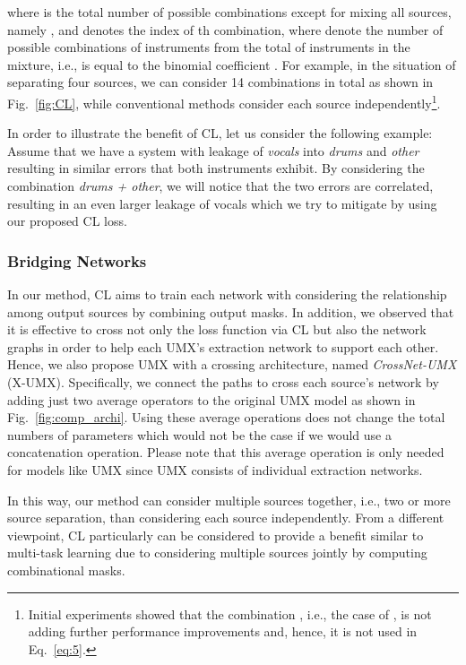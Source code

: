 \documentclass{article}
\begin{document}
where  is the total number of possible combinations except for mixing all  sources, namely , and  denotes the index of th combination, where  denote the number of possible combinations of  instruments from the total of  instruments in the mixture, i.e.,  is equal to the binomial coefficient .
For example, in the situation of separating four sources, we can consider 14  combinations in total as shown in Fig.~\ref{fig:CL}, 
while conventional methods consider each source independently\footnote{Initial experiments showed that the combination , i.e., the case of , is not adding further performance improvements and, hence, it is not used in Eq.~\eqref{eq:5}.}.


In order to illustrate the benefit of CL, let us consider the following example: Assume that we have a system with leakage of \emph{vocals} into \emph{drums} and \emph{other} resulting in similar errors that both instruments exhibit. 
By considering the combination \emph{drums + other}, we will notice that the two errors are correlated, resulting in an even larger leakage of vocals which we try to mitigate by using our proposed CL loss.

\vspace{-1mm}
\subsubsection{Bridging Networks}
\label{subsec:bridging}
\vspace{-1mm}
In our method, CL aims to train each network with considering the relationship among output sources by combining output masks.
In addition, we observed that it is effective to cross not only the loss function via CL but also the network graphs in order to help each UMX's extraction network to support each other.
Hence, we also propose UMX with a crossing architecture, named \emph{CrossNet-UMX} (X-UMX).
Specifically, we connect the paths to cross each source's network by adding just two average operators to the original UMX model as shown in Fig.~\ref{fig:comp_archi}. 
Using these average operations does not change the total numbers of parameters which would not be the case if we would use a concatenation operation.
Please note that this average operation is only needed for models like UMX since UMX consists of individual extraction networks.


In this way, our method can consider multiple sources together, i.e., two or more source separation, than considering each source independently.
From a different viewpoint, CL particularly can be considered to provide a benefit similar to multi-task learning due to considering multiple sources jointly by computing combinational masks.
\\
\end{document}
